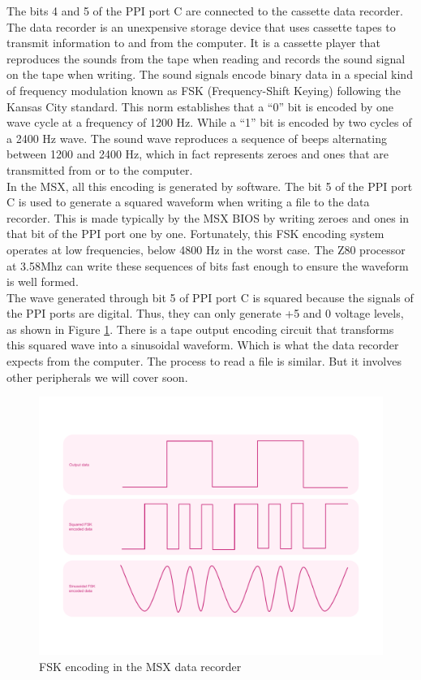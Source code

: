 The bits 4 and 5 of the PPI port C are connected to the cassette data recorder. The data recorder is an unexpensive storage device that uses cassette tapes to transmit information to and from the computer. It is a cassette player that reproduces the sounds from the tape when reading and records the sound signal on the tape when writing. The sound signals encode binary data in a special kind of frequency modulation known as FSK (Frequency-Shift Keying) following the Kansas City standard. This norm establishes that a “0” bit is encoded by one wave cycle at a frequency of 1200 Hz. While a “1” bit is encoded by two cycles of a 2400 Hz wave. The sound wave reproduces a sequence of beeps alternating between 1200 and 2400 Hz, which in fact represents zeroes and ones that are transmitted from or to the computer. \\

In the MSX, all this encoding is generated by software. The bit 5 of the PPI port C is used to generate a squared waveform when writing a file to the data recorder. This is made typically by the MSX BIOS by writing zeroes and ones in that bit of the PPI port one by one. Fortunately, this FSK encoding system operates at low frequencies, below 4800 Hz in the worst case. The Z80 processor at 3.58Mhz can write these sequences of bits fast enough to ensure the waveform is well formed. \\

The wave generated through bit 5 of PPI port C is squared because the signals of the PPI ports are digital. Thus, they can only generate +5 and 0 voltage levels, as shown in Figure \ref{fig:msx-arch-fskenc}. There is a tape output encoding circuit that transforms this squared wave into a sinusoidal waveform. Which is what the data recorder expects from the computer. The process to read a file is similar. But it involves other peripherals we will cover soon.

\begin{figure}
	\centering
	\includegraphics[width=1\linewidth,trim={0cm 80 0 80}]{images/figures/msx-arch-fskenc}
	\caption{FSK encoding in the MSX data recorder}
	\label{fig:msx-arch-fskenc}
\end{figure}

